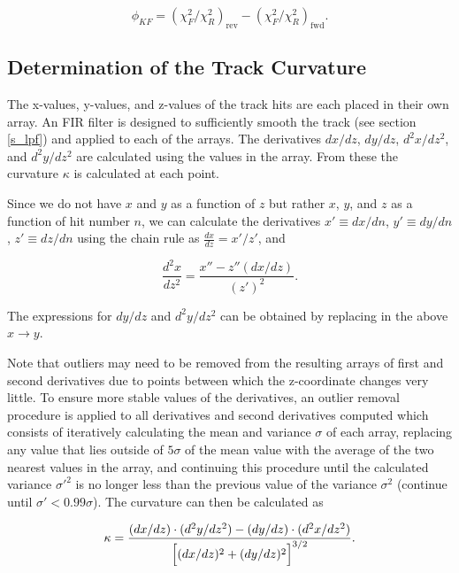 \documentclass{JINST}
\begin{document}
\begin{equation}
\phi_{KF} = (\chi^2_F/\chi^2_R)_{\mathrm{rev}} - (\chi^2_F/\chi^2_R)_{\mathrm{fwd}}.
\end{equation}

\subsection{Determination of the Track Curvature}
The x-values, y-values, and z-values of the track hits are each placed in their own array.  An FIR filter is designed to sufficiently smooth the track (see section \ref{s_lpf}) and applied to each of the arrays.  The derivatives $dx/dz$, $dy/dz$, $d^2x/dz^2$, and $d^2y/dz^2$ are calculated using the values in the array.  From these the curvature $\kappa$ is calculated at each point.

\noindent Since we do not have $x$ and $y$ as a function of $z$ but rather $x$, $y$, and $z$ as a function of hit number $n$, we can calculate the derivatives $x' \equiv dx/dn$, $y' \equiv dy/dn$, $z' \equiv dz/dn$ using the chain rule as $\frac{dx}{dz} = x'/z'$, and

\begin{equation}
\frac{d^2x}{dz^2} = \frac{x'' - z''(dx/dz)}{(z')^2}.
\end{equation}

\noindent The expressions for $dy/dz$ and $d^2y/dz^2$ can be obtained by replacing in the above $x \rightarrow y$.  

Note that outliers may need to be removed from the resulting arrays of first and second derivatives due to points between which the z-coordinate changes very little.  To ensure more stable values of the derivatives, an outlier removal procedure is applied to all derivatives and second derivatives computed which consists of iteratively calculating the mean and variance $\sigma$ of each array, replacing any value that lies outside of $5\sigma$ of the mean value with the average of the two nearest values in the array, and continuing this procedure until the calculated variance $\sigma'^2$ is no longer less than the previous value of the variance $\sigma^2$ (continue until $\sigma' < 0.99\sigma$).  The curvature can then be calculated as

\begin{equation}\label{eqn_curv}
\kappa = \frac{(dx/dz)\cdot(d^2y/dz^2) - (dy/dz)\cdot(d^2x/dz^2)}{\Bigl[(dx/dz)^2 + (dy/dz)^2\Bigr]^{3/2}}.
\end{equation}
\end{document}
